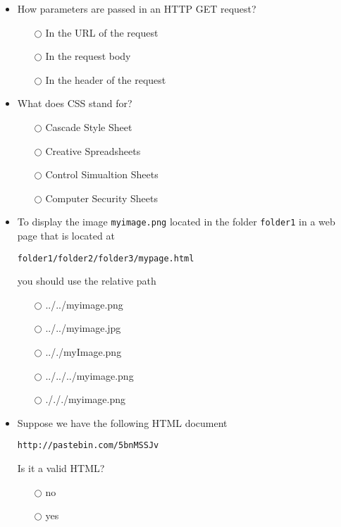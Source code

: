 \documentclass[10pt,twocolumn]{article}
\begin{document}
\begin{itemize}
    \item How parameters are passed in an HTTP GET request?
          \begin{itemize}
              \item[$\bigcirc$] In the URL of the request
              \item[$\bigcirc$] In the request body
              \item[$\bigcirc$] In the header of the request
          \end{itemize}
\end{itemize}
\begin{itemize}
    \item What does CSS stand for?
          \begin{itemize}
              \item[$\bigcirc$] Cascade Style Sheet
              \item[$\bigcirc$] Creative Spreadsheets
              \item[$\bigcirc$] Control Simualtion Sheets
              \item[$\bigcirc$] Computer Security Sheets
          \end{itemize}
\end{itemize}
\begin{itemize}
    \item To display the image \verb=myimage.png= located in the folder \verb=folder1= in a web page that is located at
          \begin{verbatim}
folder1/folder2/folder3/mypage.html
\end{verbatim}
          you should use the relative path
          \begin{itemize}
              \item[$\bigcirc$] ../../myimage.png
              \item[$\bigcirc$] ../../myimage.jpg
              \item[$\bigcirc$] .././myImage.png
              \item[$\bigcirc$] ../../../myimage.png
              \item[$\bigcirc$] ./././myimage.png
          \end{itemize}
\end{itemize}
\begin{itemize}
    \item Suppose we have the following HTML document
          \begin{verbatim}
http://pastebin.com/5bnMSSJv
\end{verbatim}
          Is it a valid HTML?
          \begin{itemize}
              \item[$\bigcirc$] no
              \item[$\bigcirc$] yes
          \end{itemize}
\end{itemize}
\end{document}
